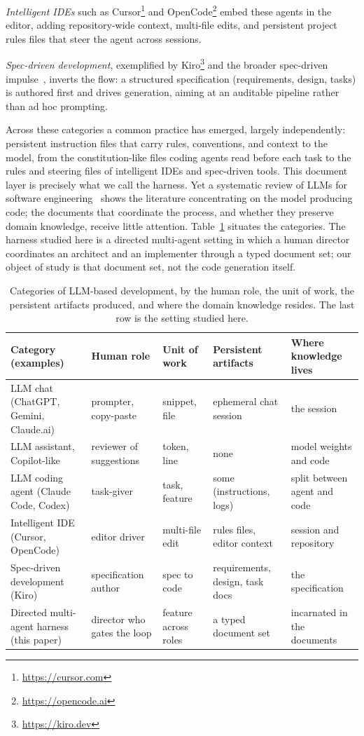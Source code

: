 \documentclass[sigconf]{acmart}
\begin{document}
\emph{Intelligent IDEs} such as Cursor\footnote{\url{https://cursor.com}} and OpenCode\footnote{\url{https://opencode.ai}} embed these agents in the editor, adding repository-wide context, multi-file edits, and persistent project rules files that steer the agent across sessions.

\emph{Spec-driven development}, exemplified by Kiro\footnote{\url{https://kiro.dev}} and the broader spec-driven impulse~\cite{fowler2025specdriven}, inverts the flow: a structured specification (requirements, design, tasks) is authored first and drives generation, aiming at an auditable pipeline rather than ad hoc prompting.

Across these categories a common practice has emerged, largely independently: persistent instruction files that carry rules, conventions, and context to the model, from the constitution-like files coding agents read before each task to the rules and steering files of intelligent IDEs and spec-driven tools. This document layer is precisely what we call the harness. Yet a systematic review of LLMs for software engineering~\cite{hou2024llm4se} shows the literature concentrating on the model producing code; the documents that coordinate the process, and whether they preserve domain knowledge, receive little attention. Table~\ref{tab:aimodes} situates the categories. The harness studied here is a directed multi-agent setting in which a human director coordinates an architect and an implementer through a typed document set; our object of study is that document set, not the code generation itself.

\begin{table}[t]
\caption{Categories of LLM-based development, by the human role, the unit of work, the persistent artifacts produced, and where the domain knowledge resides. The last row is the setting studied here.}
\label{tab:aimodes}
\small
\begin{tabularx}{\textwidth}{@{}p{3.6cm}p{2.5cm}p{2.1cm}XX@{}}
\toprule
Category (examples) & Human role & Unit of work & Persistent artifacts & Where knowledge lives \\
\midrule
LLM chat (ChatGPT, Gemini, Claude.ai) & prompter, copy-paste & snippet, file & ephemeral chat session & the session \\
LLM assistant, Copilot-like & reviewer of suggestions & token, line & none & model weights and code \\
LLM coding agent (Claude Code, Codex) & task-giver & task, feature & some (instructions, logs) & split between agent and code \\
Intelligent IDE (Cursor, OpenCode) & editor driver & multi-file edit & rules files, editor context & session and repository \\
Spec-driven development (Kiro) & specification author & spec to code & requirements, design, task docs & the specification \\
Directed multi-agent harness (this paper) & director who gates the loop & feature across roles & a typed document set & incarnated in the documents \\
\bottomrule
\end{tabularx}
\end{table}
\end{document}
